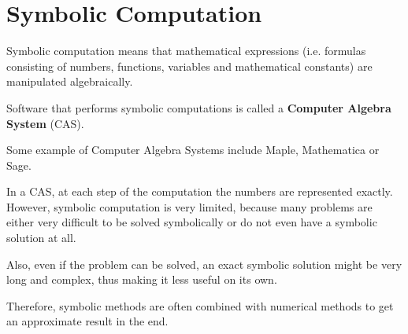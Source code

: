 \section{Symbolic Computation}
Symbolic computation means that mathematical expressions (i.e. formulas
consisting of numbers, functions, variables and mathematical constants) are
manipulated algebraically. 

Software that performs symbolic computations is
called a \textbf{Computer Algebra System} (CAS).

Some example of Computer Algebra Systems include Maple, Mathematica or Sage.

In a CAS, at each step of the computation the numbers are represented exactly.
However, symbolic computation is very limited, because many problems are either 
very difficult to be solved symbolically or do not even have a symbolic solution at all. 

Also, even if the problem can be solved, an exact symbolic solution might be very long and complex, 
thus making it less useful on its own. 

Therefore, symbolic methods are often combined with numerical methods
to get an approximate result in the end.
